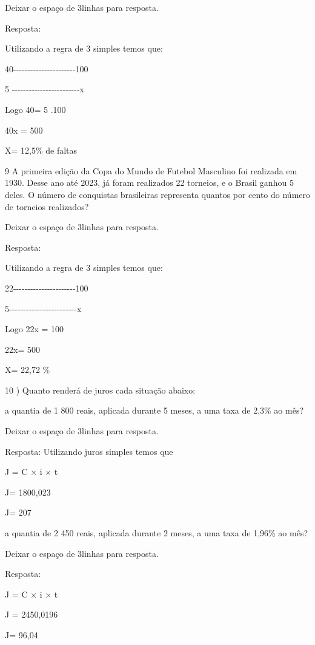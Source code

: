 Deixar o espaço de 3linhas para resposta.

Resposta:

Utilizando a regra de 3 simples temos que:

40-\/-\/-\/-\/-\/-\/-\/-\/-\/-\/-\/-\/-\/-\/-\/-\/-\/-\/-\/-\/-\/-100

5
-\/-\/-\/-\/-\/-\/-\/-\/-\/-\/-\/-\/-\/-\/-\/-\/-\/-\/-\/-\/-\/-\/-\/-x

Logo 40\times \times = 5 .100

40x = 500

X= 12,5\% de faltas

\num{9} A primeira edição da Copa do Mundo de Futebol Masculino foi realizada
em 1930. Desse ano até 2023, já foram realizados 22 torneios, e o Brasil
ganhou 5 deles. O número de conquistas brasileiras representa quantos
por cento do número de torneios realizados?

Deixar o espaço de 3linhas para resposta.

Resposta:

Utilizando a regra de 3 simples temos que:

22-\/-\/-\/-\/-\/-\/-\/-\/-\/-\/-\/-\/-\/-\/-\/-\/-\/-\/-\/-\/-\/-100

5-\/-\/-\/-\/-\/-\/-\/-\/-\/-\/-\/-\/-\/-\/-\/-\/-\/-\/-\/-\/-\/-\/-\/-x

Logo 22x = 100

22x= 500

X= 22,72 \%

10 ) Quanto renderá de juros cada situação abaixo:

\item a quantia de 1 800 reais, aplicada durante 5 meses, a uma taxa de
2,3\% ao mês?

Deixar o espaço de 3linhas para resposta.

Resposta: Utilizando juros simples temos que

{J = C × i × t}

{J= 1800,023}

{J= 207}

\item a quantia de 2 450 reais, aplicada durante 2 meses, a uma taxa de
1,96\% ao mês?

Deixar o espaço de 3linhas para resposta.

Resposta:

{J = C × i × t}

{J = 2450,0196}

{J= 96,04}

